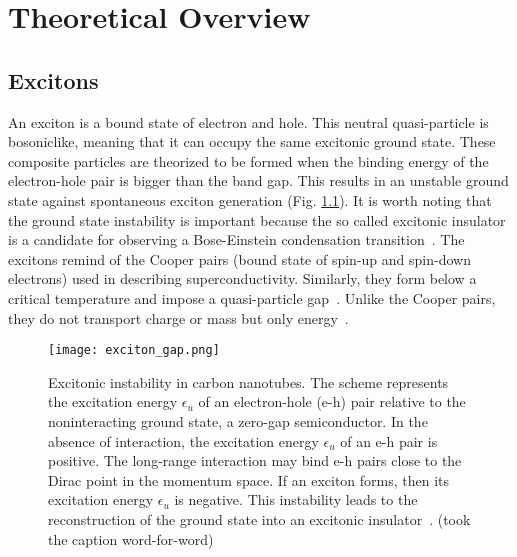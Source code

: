 
\chapter{Theoretical Overview}
\label{sec:theory}
\newcommand{\todo}[1]{\textbf{\color{red}TODO: #1}}

\section{Excitons}
An exciton is a bound state of electron and hole. This neutral quasi-particle is bosoniclike, meaning that it can occupy the same excitonic ground state. These composite particles are theorized to be formed when the binding energy of the electron-hole pair is bigger than the band gap. This results in an unstable ground state against spontaneous exciton generation (Fig. \ref{fig:exciton_gap}). It is worth noting that the ground state instability is important because the so called excitonic insulator is a candidate for observing a Bose-Einstein condensation transition~\cite{grossnev}. The excitons remind of the Cooper pairs (bound state of spin-up and spin-down electrons) used in describing superconductivity. Similarly, they form below a critical temperature and impose a quasi-particle gap~\cite{ctubes}. Unlike the Cooper pairs, they do not transport charge or mass but only energy~\cite{grossnev}. 
\begin{figure}[htbp]
    \centerline{\texttt{[image: exciton\_gap.png]}}
    \caption{Excitonic instability in carbon nanotubes. The scheme represents the excitation energy $\epsilon_u$ of an electron-hole (e-h) pair relative to the noninteracting ground state, a zero-gap semiconductor. In the absence of interaction, the excitation energy $\epsilon_u$ of an e-h pair is positive. The long-range interaction may bind e-h pairs close to the Dirac point in the momentum space. If an exciton forms, then its excitation energy $\epsilon_u$ is negative. This instability leads to the reconstruction of the ground state into an excitonic insulator~\cite{ctubes}. (took the caption word-for-word)}
    \label{fig:exciton_gap}
\end{figure}

